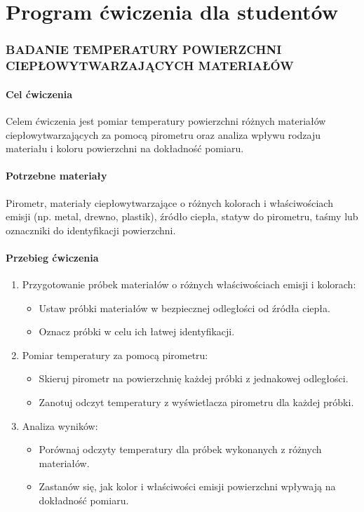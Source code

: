     \chapter*{Program ćwiczenia dla studentów}


\subsection*{BADANIE TEMPERATURY POWIERZCHNI CIEPŁOWYTWARZAJĄCYCH MATERIAŁÓW}

\subsubsection*{Cel ćwiczenia}
Celem ćwiczenia jest pomiar temperatury powierzchni różnych materiałów ciepłowytwarzających za pomocą pirometru oraz analiza wpływu rodzaju materiału i koloru powierzchni na dokładność pomiaru.

\subsubsection*{Potrzebne materiały}
Pirometr, materiały ciepłowytwarzające o różnych kolorach i właściwościach emisji (np. metal, drewno, plastik), źródło ciepła, statyw do pirometru, taśmy lub oznaczniki do identyfikacji powierzchni.

\subsubsection*{Przebieg ćwiczenia}
\begin{enumerate}
    \item Przygotowanie próbek materiałów o różnych właściwościach emisji i kolorach:
    \begin{itemize}
        \item Ustaw próbki materiałów w bezpiecznej odległości od źródła ciepła.
        \item Oznacz próbki w celu ich łatwej identyfikacji.
    \end{itemize}
    \item Pomiar temperatury za pomocą pirometru:
    \begin{itemize}
        \item Skieruj pirometr na powierzchnię każdej próbki z jednakowej odległości.
        \item Zanotuj odczyt temperatury z wyświetlacza pirometru dla każdej próbki.
    \end{itemize}
    \item Analiza wyników:
    \begin{itemize}
        \item Porównaj odczyty temperatury dla próbek wykonanych z różnych materiałów.
        \item Zastanów się, jak kolor i właściwości emisji powierzchni wpływają na dokładność pomiaru.
    \end{itemize}
\end{enumerate}


